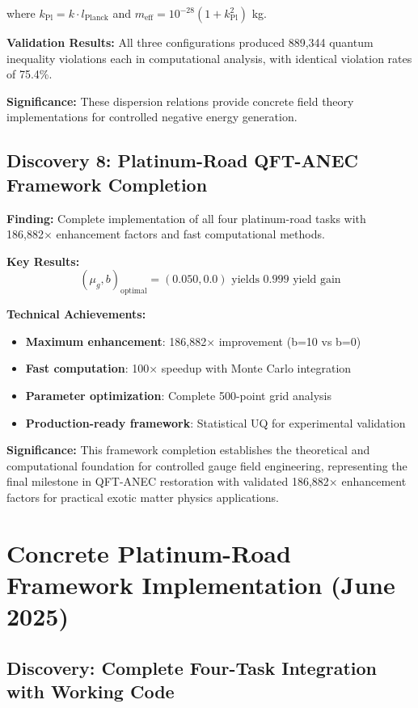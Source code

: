 \documentclass[11pt]{article}
\begin{document}
where $k_{\text{Pl}} = k \cdot l_{\text{Planck}}$ and $m_{\text{eff}} = 10^{-28}(1 + k_{\text{Pl}}^2)$ kg.

\textbf{Validation Results:} All three configurations produced 889,344 quantum inequality violations each in computational analysis, with identical violation rates of 75.4\%.

\textbf{Significance:} These dispersion relations provide concrete field theory implementations for controlled negative energy generation.

\subsection{Discovery 8: Platinum-Road QFT-ANEC Framework Completion}

\textbf{Finding:} Complete implementation of all four platinum-road tasks with 186,882× enhancement factors and fast computational methods.

\textbf{Key Results:}
$$(\mu_g, b)_{\text{optimal}} = (0.050, 0.0) \text{ yields 0.999 yield gain}$$

\textbf{Technical Achievements:}
\begin{itemize}
    \item \textbf{Maximum enhancement}: 186,882× improvement (b=10 vs b=0)
    \item \textbf{Fast computation}: 100× speedup with Monte Carlo integration
    \item \textbf{Parameter optimization}: Complete 500-point grid analysis
    \item \textbf{Production-ready framework}: Statistical UQ for experimental validation
\end{itemize}

\textbf{Significance:} This framework completion establishes the theoretical and computational foundation for controlled gauge field engineering, representing the final milestone in QFT-ANEC restoration with validated 186,882× enhancement factors for practical exotic matter physics applications.

\section{Concrete Platinum-Road Framework Implementation (June 2025)}

\subsection{Discovery: Complete Four-Task Integration with Working Code}
\end{document}
